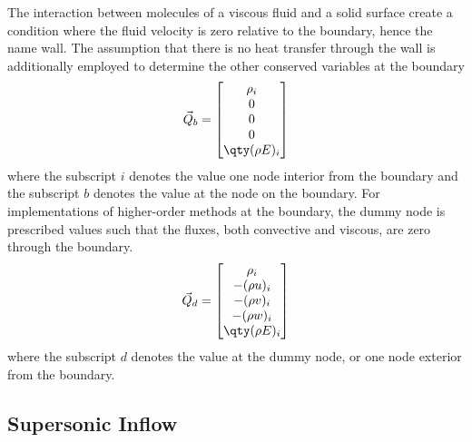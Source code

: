 The interaction between molecules of a viscous fluid and a solid surface create a condition where the fluid velocity is zero relative to the boundary, hence the name  wall. The assumption that there is no heat transfer through the wall is additionally employed to determine the other conserved variables at the boundary
%
%
%
\begin{equation}
\vec{Q}_b = \begin{bmatrix} \rho_i \\
  0 \\
  0 \\
  0 \\
  \qty(\rho E)_i \end{bmatrix}
\end{equation}
%
where the subscript $i$ denotes the value one node interior from the boundary and the subscript $b$ denotes the value at the node on the boundary. For implementations of higher-order methods at the boundary, the dummy node is prescribed values such that the fluxes, both convective and viscous, are zero through the boundary.
%
\begin{equation}
\vec{Q}_d = \begin{bmatrix} \rho_i \\
  -(\rho u)_i \\
  -(\rho v)_i \\
  -(\rho w)_i \\
  \qty(\rho E)_i \end{bmatrix}
\end{equation}
%
where the subscript $d$ denotes the value at the dummy node, or one node exterior from the boundary.

\subsection{Supersonic Inflow}

